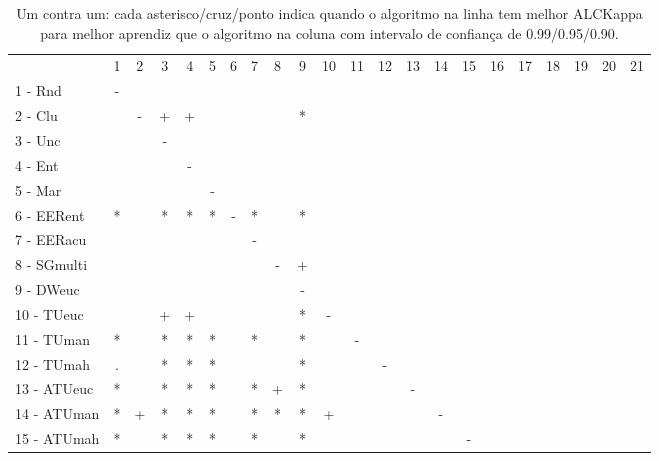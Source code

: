 \begin{table}[h]
\caption{Um contra um: cada asterisco/cruz/ponto indica quando o algoritmo na
linha tem melhor ALCKappa para melhor aprendiz que o algoritmo na coluna com intervalo
de confiança de 0.99/0.95/0.90.}
\begin{center}
\begin{tabular}{lcc|cc|cc|cc|cc|cc|cc|cc|cc|cc|c}
 			& 1 & 2 & 3 & 4 & 5 & 6 & 7 & 8 & 9 & 10 & 11 & 12 & 13 & 14 & 15 & 16 & 17 & 18 & 19 & 20 & 21\\
1 - Rnd  	& - &   &   &   &   &   &   &   &   &   &   &   &   &   &   &   &   &   &   &   &   \\
2 - Clu  	&   & - & + & + &   &   &   &   & * &   &   &   &   &   &   &   &   &   &   &   &   \\ \hline
3 - Unc  	&   &   & - &   &   &   &   &   &   &   &   &   &   &   &   &   &   &   &   &   &   \\
4 - Ent  	&   &   &   & - &   &   &   &   &   &   &   &   &   &   &   &   &   &   &   &   &   \\ \hline
5 - Mar  	&   &   &   &   & - &   &   &   &   &   &   &   &   &   &   &   &   &   &   &   &   \\
6 - EERent	& * &   & * & * & * & - & * &   & * &   &   &   &   &   &   &   &   &   &   &   &   \\ \hline
7 - EERacu	&   &   &   &   &   &   & - &   &   &   &   &   &   &   &   &   &   &   &   &   &   \\
8 - SGmulti	&   &   &   &   &   &   &   & - & + &   &   &   &   &   &   &   &   &   &   &   &   \\ \hline
9 - DWeuc	&   &   &   &   &   &   &   &   & - &   &   &   &   &   &   &   &   &   &   &   &   \\
10 - TUeuc	&   &   & + & + &   &   &   &   & * & - &   &   &   &   &   &   &   &   &   &   &   \\ \hline
11 - TUman	& * &   & * & * & * &   & * &   & * &   & - &   &   &   &   &   &   &   &   &   &   \\
12 - TUmah	& . &   & * & * & * &   &   &   & * &   &   & - &   &   &   &   &   &   &   &   &   \\ \hline
13 - ATUeuc	& * &   & * & * & * &   & * & + & * &   &   &   & - &   &   &   &   &   &   &   &   \\
14 - ATUman	& * & + & * & * & * &   & * & * & * & + &   &   &   & - &   &   &   &   &   &   &   \\ \hline
15 - ATUmah	& * &   & * & * & * &   & * &   & * &   &   &   &   &   & - &   &   &   &   &   &   \\

\end{tabular}
\end{center}
\end{table}
